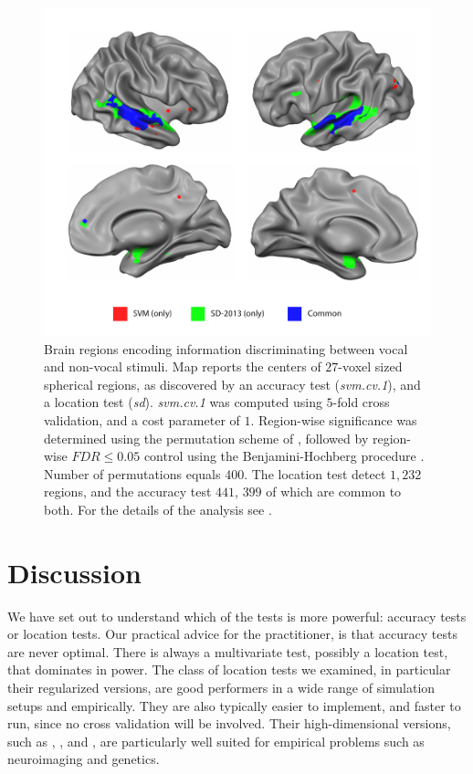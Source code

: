 \documentclass[12pt,a4paper]{article}
\begin{document}
\begin{figure}[th]
\centering
\includegraphics[width=0.7\linewidth]{"art/svm_vs_SD"}
\caption{\footnotesize
Brain regions encoding information discriminating between vocal and non-vocal stimuli.
Map reports the centers of $27$-voxel sized spherical regions, as discovered by an accuracy test (\emph{svm.cv.1}), and a location test (\emph{sd}). 
\emph{svm.cv.1} was computed using $5$-fold cross validation, and a cost parameter of $1$. 
Region-wise significance was determined using the permutation scheme of \cite{stelzer_statistical_2013}, followed by region-wise $FDR \leq 0.05$ control using the Benjamini-Hochberg procedure \citep{benjamini_controlling_1995}.
Number of permutations equals $400$.
The location test detect $1,232$ regions, and the accuracy test $441$, $399$ of which are common to both.
For the details of the analysis see \cite{gilron_quantifying_2016}.  
  }
\label{fig:read_data}
\end{figure}








\section{Discussion}
\label{sec:discussion}

We have set out to understand which of the tests is more powerful: accuracy tests or location tests. 
Our practical advice for the practitioner, is that accuracy tests are never optimal. 
There is always a multivariate test, possibly a location test, that dominates in power. 
The class of location tests we examined, in particular their regularized versions, are good performers in a wide range of simulation setups and empirically. 
They are also typically easier to implement, and faster to run, since no cross validation will be involved. 
Their high-dimensional versions, such as \cite{schafer_shrinkage_2005}, \cite{goeman2006testing}, and \cite{srivastava_multivariate_2007}, are particularly well suited for empirical problems such as neuroimaging and genetics.
\end{document}
